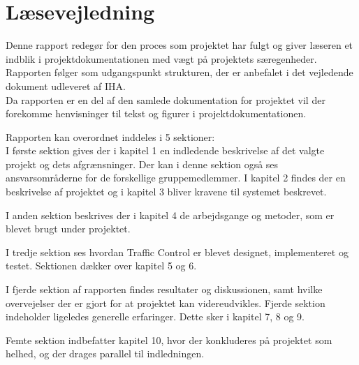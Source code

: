 \section{Læsevejledning}
Denne rapport redegør for den proces som projektet har fulgt og giver læseren et indblik i projektdokumentationen med vægt på projektets særegenheder. Rapporten følger som udgangspunkt strukturen, der er anbefalet i det vejledende dokument udleveret af IHA.\\
Da rapporten er en del af den samlede dokumentation for projektet vil der forekomme
henvisninger til tekst og figurer i projektdokumentationen.


Rapporten kan overordnet inddeles i 5 sektioner:\\
I første sektion gives der i kapitel 1 en indledende beskrivelse af det valgte projekt og
dets afgrænsninger. Der kan i denne sektion også ses ansvarsområderne for de forskellige
gruppemedlemmer. I kapitel 2 findes der en beskrivelse af projektet og i kapitel 3 bliver
kravene til systemet beskrevet.

I anden sektion beskrives der i kapitel 4 de arbejdsgange og metoder, som er blevet brugt
under projektet.

I tredje sektion ses hvordan Traffic Control er blevet designet, implementeret og testet. 
Sektionen dækker over kapitel 5 og 6.

I fjerde sektion af rapporten findes resultater og diskussionen, samt hvilke overvejelser
der er gjort for at projektet kan videreudvikles. Fjerde sektion indeholder ligeledes generelle erfaringer. Dette sker i kapitel 7, 8 og 9.

Femte sektion indbefatter kapitel 10, hvor der konkluderes på projektet som helhed, og
der drages parallel til indledningen.

